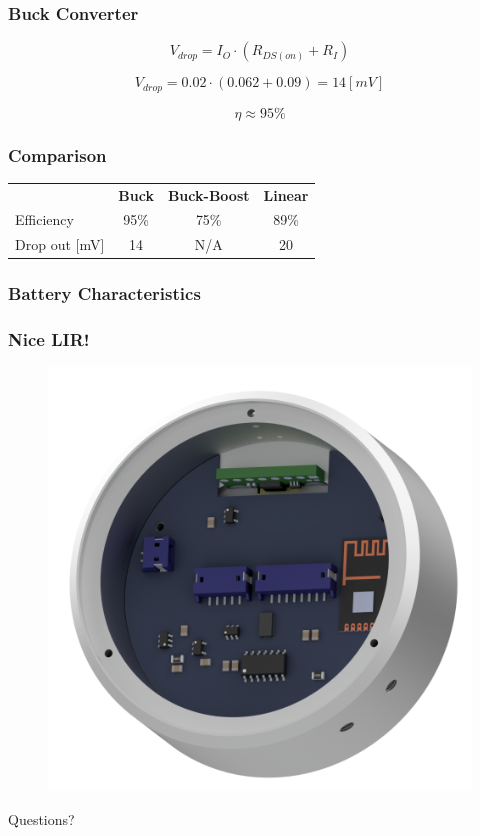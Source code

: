 \documentclass[mathserif]{beamer}
\begin{document}
\begin{frame}[c]\frametitle{Buck Converter}
	\begin{equation}
		V_{drop} = I_{O} \cdot (R_{DS(on)}+R_I)
		\label{eq:drop_v_tps62}
	\end{equation}

	\begin{equation}
		V_{drop} = 0.02 \cdot (0.062+0.09) = 14 [mV]
		\label{eq:drop_v_tps62_2}
	\end{equation}

	\begin{equation}
		\eta \approx 95\%
	\end{equation}
\end{frame}

\begin{frame}[c]\frametitle{Comparison}
	\begin{table}[h]
		\begin{tabular}{l|c|c|c}
			  ~				& \textbf{Buck} 	& \textbf{Buck-Boost}& \textbf{Linear}\tabularnewline 
			 Efficiency  	& 95\% 	& 75\%		& 89\%	\\
			 Drop out [mV]	& 14  	& N/A		& 20	\\
		\end{tabular}
	\end{table}
\end{frame}

\begin{frame}[t]\frametitle{Battery Characteristics}
    \begin{figure}[h]
		\centering
		
	\end{figure}
\end{frame}

\begin{frame}[c]\frametitle{Nice LIR!}
	\begin{figure}
	\centering
	\includegraphics[width=.7\linewidth]{graphics/joint_assembly}
	\end{figure}
\end{frame}


\begin{frame}[standout]
  Questions?
\end{frame}
\end{document}
